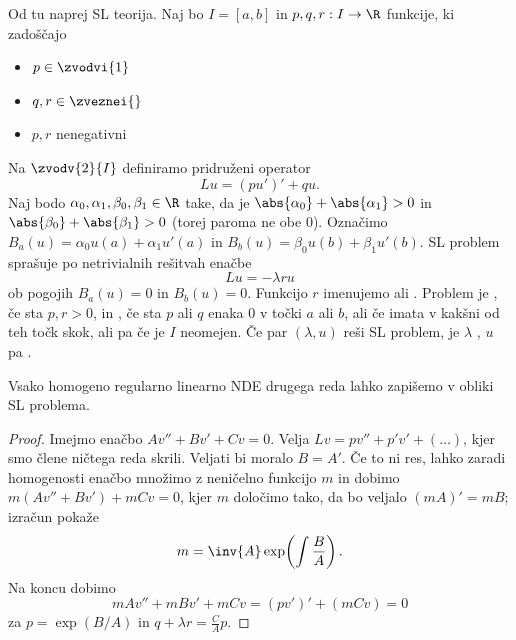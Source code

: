 
Od tu naprej SL teorija.
Naj bo $I = [a,b]$ in $p,q,r: I \to \R$ funkcije, ki zadoščajo
\begin{itemize}
\item $p \in \zvodvi{1}$
\item $q,r \in \zveznei{}$
\item $p,r$ nenegativni
\end{itemize}
Na $\zvodv{2}{I}$ definiramo pridruženi  operator
\[
  Lu = (p u')' + qu.
\]
Naj bodo $\alpha_0, \alpha_1, \beta_0, \beta_1 \in \R$ take, da je
$\abs{\alpha_0} + \abs{\alpha_1} > 0$ in $\abs{\beta_0} + \abs{\beta_1} > 0$
(torej paroma ne obe $0$).
Označimo $B_a(u) = \alpha_0 u(a) + \alpha_1 u'(a)$ in $B_b(u) = \beta_0 u(b) +
\beta_1 u'(b)$.
SL problem sprašuje po netrivialnih rešitvah enačbe
\begin{equation}
  \label{eq:sl}
  Lu = - \lambda r u
\end{equation}
ob pogojih $B_a(u) = 0$ in $B_b(u) = 0$.
Funkcijo $r$ imenujemo  ali .
Problem je , če sta $p, r > 0$, in , če sta
$p$ ali $q$ enaka $0$ v točki $a$ ali $b$, ali če imata v kakšni od teh točk
skok, ali pa če je $I$ neomejen.
Če par $(\lambda, u)$ reši SL problem, je $\lambda$ , $u$
pa .


\begin{trditev}
  Vsako homogeno regularno linearno NDE drugega reda lahko zapišemo v obliki SL
  problema.
\end{trditev}

\begin{proof}
  Imejmo enačbo $A v'' + B v' + C v = 0$.
  Velja $Lv = p v'' + p' v' + (\ldots)$, kjer smo člene ničtega reda skrili.
  Veljati bi moralo $B = A'$.
  Če to ni res, lahko zaradi homogenosti enačbo množimo z neničelno funkcijo $m$
  in dobimo $m(A v'' + B v') + m C v = 0$, kjer $m$ določimo tako, da bo veljalo
  $(mA)' = mB$; izračun pokaže
  \[
	m = \inv{A} \exp\!\left( \int \frac{B}{A} \right).
  \]
  Na koncu dobimo
  \[
	m A v'' + m B v' + m C v = (p v')' + (m C v) = 0
  \]
  za $p = \exp(B/A)$ in $q + \lambda r = \frac{C}{A} p$.
\end{proof}


